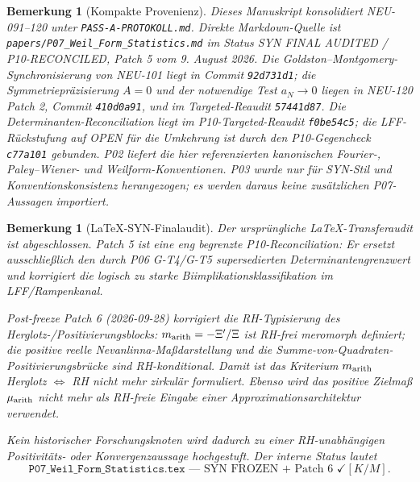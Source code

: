 \documentclass[11pt,a4paper]{amsart}
\newtheorem{remark}[theorem]{Bemerkung}
\begin{document}
\begin{remark}[Kompakte Provenienz]\label{rem:provenance}
Dieses Manuskript konsolidiert NEU-091--120 unter
\texttt{PASS-A-PROTOKOLL.md}. Direkte Markdown-Quelle ist
\texttt{papers/P07\_Weil\_Form\_Statistics.md} im Status
\emph{SYN FINAL AUDITED / P10-RECONCILED}, Patch 5 vom 9. August 2026.
Die Goldston--Montgomery-Synchronisierung von NEU-101 liegt in Commit
\texttt{92d731d1}; die Symmetriepräzisierung $A=0$ und der notwendige Test
$a_N\to0$ liegen in NEU-120 Patch 2, Commit \texttt{410d0a91}, und im
Targeted-Reaudit \texttt{57441d87}. Die Determinanten-Reconciliation liegt im
P10-Targeted-Reaudit \texttt{f0be54c5}; die LFF-Rückstufung auf OPEN für die
Umkehrung ist durch den P10-Gegencheck \texttt{c77a101} gebunden. P02 liefert
die hier referenzierten kanonischen Fourier-, Paley--Wiener- und
Weilform-Konventionen. P03 wurde nur für SYN-Stil und
Konventionskonsistenz herangezogen; es werden daraus keine zusätzlichen
P07-Aussagen importiert.
\end{remark}

\begin{remark}[LaTeX-SYN-Finalaudit]\label{rem:audit-status}
Der ursprüngliche LaTeX-Transferaudit ist abgeschlossen. Patch 5 ist eine eng
begrenzte P10-Reconciliation: Er ersetzt ausschließlich den durch P06 G-T4/G-T5
supersedierten Determinantengrenzwert und korrigiert die logisch zu starke
Biimplikationsklassifikation im LFF/Rampenkanal.

Post-freeze Patch 6 (2026-09-28) korrigiert die RH-Typisierung des
Herglotz-/Positivierungsblocks: $m_{\rm arith}=-\Xi'/\Xi$ ist RH-frei
meromorph definiert; die positive reelle Nevanlinna-Maßdarstellung und die
Summe-von-Quadraten-Positivierungsbrücke sind RH-konditional. Damit ist das
Kriterium $m_{\rm arith}$ Herglotz $\Leftrightarrow$ RH nicht mehr
zirkulär formuliert. Ebenso wird das positive Zielmaß $\mu_{\rm arith}$
nicht mehr als RH-freie Eingabe einer Approximationsarchitektur verwendet.

Kein historischer Forschungsknoten wird dadurch zu einer RH-unabhängigen
Positivitäts- oder Konvergenzaussage hochgestuft. Der interne Status lautet
\[
  \boxed{\texttt{P07\_Weil\_Form\_Statistics.tex}\text{ --- SYN FROZEN + Patch 6 }\checkmark[K/M]}.
\]
\end{remark}
\end{document}
